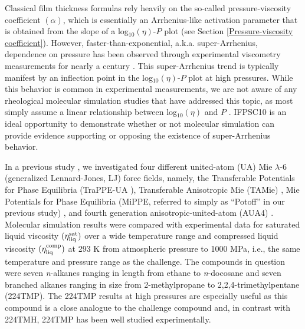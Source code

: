 \documentclass[preprint,review,12pt]{elsarticle}
\begin{document}
	Classical film thickness formulas rely heavily on the so-called pressure-viscosity coefficient $(\alpha)$, which is essentially an Arrhenius-like activation parameter that is obtained from the slope of a log$_{10}(\eta)$-$P$ plot (see Section \ref{Pressure-viscosity coefficient}). However, faster-than-exponential, a.k.a. super-Arrhenius, dependence on pressure has been observed through experimental viscometry measurements for nearly a century \cite{Bair2016}. This super-Arrhenius trend is typically manifest by an inflection point in the log$_{10}(\eta)$-$P$ plot at high pressures. While this behavior is common in experimental measurements, we are not aware of any rheological molecular simulation studies that have addressed this topic, as most simply assume a linear relationship between log$_{10}(\eta)$ and $P$ \cite{Mundy1996,McCabe2001,Liu2015}. IFPSC10 is an ideal opportunity to demonstrate whether or not molecular simulation can provide evidence supporting or opposing the existence of super-Arrhenius behavior.
	
	
	In a previous study \cite{Postdoc_3}, we investigated four different united-atom (UA) Mie $\lambda$-6 (generalized Lennard-Jones, LJ) force fields, namely, the Transferable Potentials for Phase Equilibria (TraPPE-UA \cite{TraPPE,Martin1999,TraPPEUA2}), Transferable Anisotropic Mie (TAMie) \cite{TAMie,Weidler2016}, Mie Potentials for Phase Equilibria (MiPPE, referred to simply as ``Potoff'' in our previous study) \cite{Mie,Potoff_branched}, and fourth generation anisotropic-united-atom (AUA4) \cite{AUA4,Nieto2006,Nieto2008}. Molecular simulation results were compared with experimental data for saturated liquid viscosity $(\eta_{\rm liq}^{\rm sat})$ over a wide temperature range and compressed liquid viscosity $(\eta_{\rm liq}^{\rm comp})$ at 293 K from atmospheric pressure to 1000 MPa, i.e., the same temperature and pressure range as the challenge. The compounds in question were seven \textit{n}-alkanes ranging in length from ethane to \textit{n}-docosane and seven branched alkanes ranging in size from 2-methylpropane to 2,2,4-trimethylpentane (224TMP). The 224TMP results at high pressures are especially useful as this compound is a close analogue to the challenge compound and, in contrast with 224TMH, 224TMP has been well studied experimentally.
	
\end{document}
